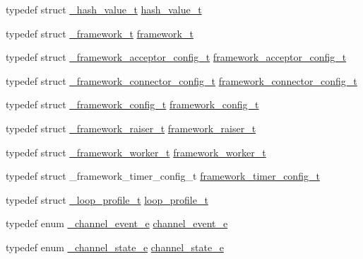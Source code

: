 \begin{DoxyCompactItemize}
\item 
typedef struct \hyperlink{a00016}{\+\_\+hash\+\_\+value\+\_\+t} \hyperlink{a00051_af7ecd66aeef0ce1b0495e5f65e77733e_af7ecd66aeef0ce1b0495e5f65e77733e}{hash\+\_\+value\+\_\+t}
\item 
typedef struct \hyperlink{a00013}{\+\_\+framework\+\_\+t} \hyperlink{a00051_a6149d769f6f07ed14a40a271c95d8463_a6149d769f6f07ed14a40a271c95d8463}{framework\+\_\+t}
\item 
typedef struct \hyperlink{a00009}{\+\_\+framework\+\_\+acceptor\+\_\+config\+\_\+t} \hyperlink{a00051_a61a4e424ff4c86631423dedd97c40064_a61a4e424ff4c86631423dedd97c40064}{framework\+\_\+acceptor\+\_\+config\+\_\+t}
\item 
typedef struct \hyperlink{a00011}{\+\_\+framework\+\_\+connector\+\_\+config\+\_\+t} \hyperlink{a00051_a81253f4c995b97e69be0e67f7a26097f_a81253f4c995b97e69be0e67f7a26097f}{framework\+\_\+connector\+\_\+config\+\_\+t}
\item 
typedef struct \hyperlink{a00010}{\+\_\+framework\+\_\+config\+\_\+t} \hyperlink{a00051_a55b26efa9e6ee05514d087ba2593a54b_a55b26efa9e6ee05514d087ba2593a54b}{framework\+\_\+config\+\_\+t}
\item 
typedef struct \hyperlink{a00012}{\+\_\+framework\+\_\+raiser\+\_\+t} \hyperlink{a00051_aa3ac31db191829c9e6db624d660a2563_aa3ac31db191829c9e6db624d660a2563}{framework\+\_\+raiser\+\_\+t}
\item 
typedef struct \hyperlink{a00014}{\+\_\+framework\+\_\+worker\+\_\+t} \hyperlink{a00051_aeb7a44e6b579659a8aae81f3ab819af3_aeb7a44e6b579659a8aae81f3ab819af3}{framework\+\_\+worker\+\_\+t}
\item 
typedef struct \+\_\+framework\+\_\+timer\+\_\+config\+\_\+t \hyperlink{a00051_a5897519e55beac27c0c789a37e3e0daf_a5897519e55beac27c0c789a37e3e0daf}{framework\+\_\+timer\+\_\+config\+\_\+t}
\item 
typedef struct \hyperlink{a00031}{\+\_\+loop\+\_\+profile\+\_\+t} \hyperlink{a00051_ad060e1396346d2f5db1ec0597376a107_ad060e1396346d2f5db1ec0597376a107}{loop\+\_\+profile\+\_\+t}
\item 
typedef enum \hyperlink{a00051_a1460362ccf3a6ba930a1a3ac2f73f3ea_a1460362ccf3a6ba930a1a3ac2f73f3ea}{\+\_\+channel\+\_\+event\+\_\+e} \hyperlink{a00051_a5ad43ab162fdf9ad53cde10ed3d87d99_a5ad43ab162fdf9ad53cde10ed3d87d99}{channel\+\_\+event\+\_\+e}
\item 
typedef enum \hyperlink{a00051_a18bbc160902cdba0f52f5a3cd879b47f_a18bbc160902cdba0f52f5a3cd879b47f}{\+\_\+channel\+\_\+state\+\_\+e} \hyperlink{a00051_a1956eea3012f780b5d592a9d09d9873c_a1956eea3012f780b5d592a9d09d9873c}{channel\+\_\+state\+\_\+e}

\end{DoxyCompactItemize}
